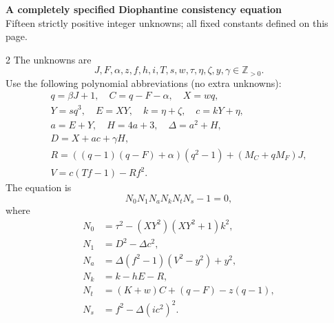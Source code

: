 \documentclass[10pt]{article}
\begin{document}
\begin{center}
{\large\bfseries A completely specified Diophantine consistency equation}\\[-1pt]
{\small Fifteen strictly positive integer unknowns; all fixed constants defined on this page.}
\end{center}
\vspace{-7pt}
\begin{multicols}{2}
\small
The unknowns are
\[
 J,F,\alpha,z,f,h,i,T,s,w,\tau,\eta,\zeta,y,\gamma\in\mathbb Z_{>0}.
\]
Use the following polynomial abbreviations (no extra unknowns):
\[
\begin{gathered}
q=\beta J+1,\quad C=q-F-\alpha,\quad X=wq,\\
Y=sq^3,\quad E=XY,\quad k=\eta+\zeta,\quad c=kY+\eta,\\
a=E+Y,\quad H=4a+3,\quad\Delta=a^2+H,\\
D=X+ac+\gamma H,\\
R=((q-1)(q-F)+\alpha)(q^2-1)+(M_C+qM_F)J,\\
V=c(Tf-1)-Rf^2.
\end{gathered}
\]
The equation is
\[
\boxed{N_0N_1N_aN_kN_tN_s-1=0,}
\]
where
\begin{align*}
N_0&=\tau^2-(XY^2)(XY^2+1)k^2,\\
N_1&=D^2-\Delta c^2,\\
N_a&=\Delta(f^2-1)(V^2-y^2)+y^2,\\
N_k&=k-hE-R,\\
N_t&=(K+w)C+(q-F)-z(q-1),\\
N_s&=f^2-\Delta(ic^2)^2.
\end{align*}


\end{multicols}
\end{document}
